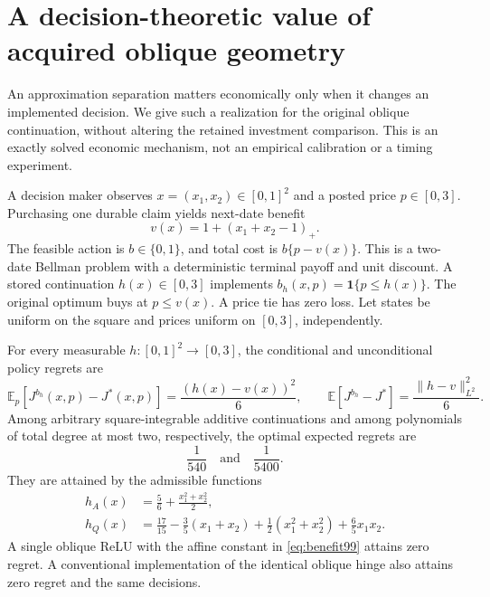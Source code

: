 \section{A decision-theoretic value of acquired oblique geometry}\label{sec:decision99}
An approximation separation matters economically only when it changes an implemented decision. We give such a realization for the original oblique continuation, without altering the retained investment comparison. This is an exactly solved economic mechanism, not an empirical calibration or a timing experiment.

A decision maker observes $x=(x_1,x_2)\in[0,1]^2$ and a posted price $p\in[0,3]$. Purchasing one durable claim yields next-date benefit
\begin{equation}\label{eq:benefit99}
 v(x)=1+(x_1+x_2-1)_+.
\end{equation}
The feasible action is $b\in\{0,1\}$, and total cost is $b\{p-v(x)\}$. This is a two-date Bellman problem with a deterministic terminal payoff and unit discount. A stored continuation $h(x)\in[0,3]$ implements $b_h(x,p)=\boldsymbol1\{p\le h(x)\}$. The original optimum buys at $p\le v(x)$. A price tie has zero loss. Let states be uniform on the square and prices uniform on $[0,3]$, independently.

\begin{theorem}\label{thm:decision99}
For every measurable $h:[0,1]^2\to[0,3]$, the conditional and unconditional policy regrets are
\begin{equation}\label{eq:decisionloss99}
 \mathbb E_p[J^{b_h}(x,p)-J^*(x,p)]
       =\frac{(h(x)-v(x))^2}{6},\qquad
 \mathbb E[J^{b_h}-J^*]=\frac{\|h-v\|_{L^2}^2}{6}.
\end{equation}
Among arbitrary square-integrable additive continuations and among polynomials of total degree at most two, respectively, the optimal expected regrets are
\begin{equation}\label{eq:separation99}
 \frac1{540}\quad\text{and}\quad\frac1{5400}.
\end{equation}
They are attained by the admissible functions
\begin{align}
 h_A(x)&=\frac56+\frac{x_1^2+x_2^2}{2},\label{eq:additive99}\\
 h_Q(x)&=\frac{17}{15}-\frac35(x_1+x_2)
              +\frac12(x_1^2+x_2^2)+\frac65x_1x_2.\label{eq:quadratic99}
\end{align}
A single oblique ReLU with the affine constant in \eqref{eq:benefit99} attains zero regret. A conventional implementation of the identical oblique hinge also attains zero regret and the same decisions.
\end{theorem}

